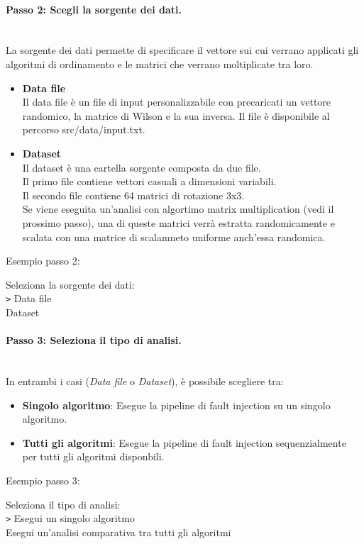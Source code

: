 \documentclass{article}
\begin{document}
\paragraph{Passo 2: Scegli la sorgente dei dati.}\leavevmode\\
La sorgente dei dati permette di specificare il vettore sui cui verrano applicati gli algoritmi di ordinamento e le matrici che verrano moltiplicate tra loro.
\begin{itemize}
    \item \textbf{Data file} \\Il data file è un file di input personalizzabile con precaricati un vettore randomico, la matrice di Wilson e la sua inversa. Il file è disponibile al percorso src/data/input.txt.
    \item \textbf{Dataset} \\ Il dataset è una cartella sorgente composta da due file. \\Il primo file contiene vettori casuali a dimensioni variabili.\\ 
    Il secondo file contiene 64 matrici di rotazione 3x3. \\
    Se viene eseguita un'analisi con algortimo matrix multiplication (vedi il prossimo passo), una di queste matrici verrà estratta randomicamente e scalata con una matrice di scalamneto uniforme anch'essa randomica.
\end{itemize}
Esempio passo 2:
\begin{tcolorbox}[colback=black, coltext=white, sharp corners, boxrule=0.5mm, width=\textwidth]
    Seleziona la sorgente dei dati: \\
    \texttt{>} Data file \\
    \hspace{2.5em}Dataset
\end{tcolorbox}


\paragraph{Passo 3: Seleziona il tipo di analisi.}\leavevmode\\
In entrambi i casi (\textit{Data file} o \textit{Dataset}), è possibile scegliere tra:
\begin{itemize}
    \item \textbf{Singolo algoritmo}: Esegue la pipeline di fault injection su un singolo algoritmo.
    \item \textbf{Tutti gli algoritmi}: Esegue la pipeline di fault injection sequenzialmente per tutti gli algoritmi disponbili.
\end{itemize}
Esempio passo 3:
\begin{tcolorbox}[colback=black, coltext=white, sharp corners, boxrule=0.5mm, width=\textwidth]
    Seleziona il tipo di analisi: \\
    \texttt{>} Esegui un singolo algoritmo \\
    \hspace{2.5em}Esegui un'analisi comparativa tra tutti gli algoritmi
\end{tcolorbox}
\end{document}
